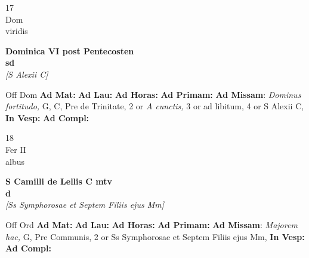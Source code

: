 \documentclass[10pt, openany]{book}
\begin{document}
        \begin{center}
            \begin{minipage}{3.5in}
                \vspace{2em}
                \begin{minipage}{0.5in}
                    {\Huge 17} \\
                    {\normalsize Dom} \\
                    {\normalsize viridis}
                \end{minipage}
                \begin{minipage}{3.0in}
                    \textbf{ \large Dominica VI post Pentecosten \\
                    \textnormal{\normalsize sd}} \\ \textit{[S Alexii C]} \\ 
                \end{minipage}
                \begin{justify}Off Dom
                    \textbf{Ad Mat: }
                    \textbf{Ad Lau: }
                    \textbf{Ad Horas: }
                    \textbf{Ad Primam: }\textbf{Ad Missam}: \textit{Dominus fortitudo,} G, C, Pre de Trinitate, 2 or \textit{A cunctis,} 3 or ad libitum, 4 or S Alexii C,  
                    \textbf{In Vesp: }
                    \textbf{Ad Compl: }
                \end{justify}
            \end{minipage}
        \end{center}
    
        \begin{center}
            \begin{minipage}{3.5in}
                \vspace{2em}
                \begin{minipage}{0.5in}
                    {\Huge 18} \\
                    {\normalsize Fer II} \\
                    {\normalsize albus}
                \end{minipage}
                \begin{minipage}{3.0in}
                    \textbf{ \large S Camilli de Lellis C mtv \\
                    \textnormal{\normalsize d}} \\ \textit{[Ss Symphorosae et Septem Filiis ejus Mm]} \\ 
                \end{minipage}
                \begin{justify}Off Ord
                    \textbf{Ad Mat: }
                    \textbf{Ad Lau: }
                    \textbf{Ad Horas: }
                    \textbf{Ad Primam: }\textbf{Ad Missam}: \textit{Majorem hac,} G, Pre Communis, 2 or Ss Symphorosae et Septem Filiis ejus Mm,  
                    \textbf{In Vesp: }
                    \textbf{Ad Compl: }
                \end{justify}
            \end{minipage}
        \end{center}
    
\end{document}
